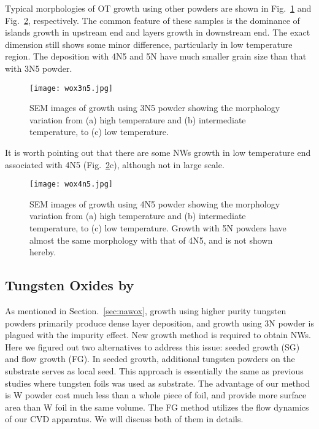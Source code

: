Typical morphologies of OT growth using other powders are shown in Fig.~\ref{fig:wox3n5} and Fig.~\ref{fig:wox4n5}, respectively. The common feature of these samples is the dominance of islands growth in upstream end and layers growth in downstream end. The exact dimension still shows some minor difference, particularly in low temperature region. The deposition with 4N5 and 5N have much smaller grain size than that with 3N5 powder.
\begin{figure}[htb]
\centering
\texttt{[image: wox3n5.jpg]}
\caption[SEM images of  growth using 3N5 powder]{SEM images of  growth using 3N5 powder showing the morphology variation from (a) high temperature and (b) intermediate temperature, to (c) low temperature.}
\label{fig:wox3n5}
\end{figure}
It is worth pointing out that there are some NWs growth in low temperature end associated with 4N5 (Fig.~\ref{fig:wox4n5}c), although not in large scale.
\begin{figure}[htb]
\centering
\texttt{[image: wox4n5.jpg]}
\caption[SEM images of  growth using 4N5 powder]{SEM images of  growth using 4N5 powder showing the morphology variation from (a) high temperature and (b) intermediate temperature, to (c) low temperature. Growth with 5N powders have almost the same morphology with that of 4N5, and is not shown hereby.}
\label{fig:wox4n5}
\end{figure}


\subsection{Tungsten Oxides by }\label{sec:sgfg}

As mentioned in Section.~\ref{sec:nawox}, growth using higher purity tungsten powders primarily produce dense layer deposition, and growth using 3N powder is plagued with the impurity effect. New growth method is required to obtain  NWs. Here we figured out two alternatives to address this issue: seeded growth (SG) and flow growth (FG). In seeded growth, additional tungsten powders on the substrate serves as local seed. This approach is essentially the same as previous studies where tungsten foils was used as substrate. The advantage of our method is W powder cost much less than a whole piece of foil, and provide more surface area than W foil in the same volume. The FG method utilizes the flow dynamics of our CVD apparatus. We will discuss both of them in details.

